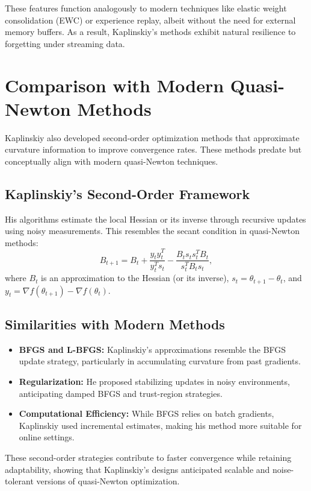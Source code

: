 \documentclass[12pt]{article}
\begin{document}
These features function analogously to modern techniques like elastic weight consolidation (EWC) or experience replay, albeit without the need for external memory buffers. As a result, Kaplinskiy's methods exhibit natural resilience to forgetting under streaming data.

\section{Comparison with Modern Quasi-Newton Methods}
Kaplinskiy also developed second-order optimization methods that approximate curvature information to improve convergence rates. These methods predate but conceptually align with modern quasi-Newton techniques.

\subsection*{Kaplinskiy's Second-Order Framework}
His algorithms estimate the local Hessian or its inverse through recursive updates using noisy measurements. This resembles the secant condition in quasi-Newton methods:
\begin{equation}
B_{t+1} = B_t + \frac{y_t y_t^T}{y_t^T s_t} - \frac{B_t s_t s_t^T B_t}{s_t^T B_t s_t},
\end{equation}
where $B_t$ is an approximation to the Hessian (or its inverse), $s_t = \theta_{t+1} - \theta_t$, and $y_t = \nabla f(\theta_{t+1}) - \nabla f(\theta_t)$.

\subsection*{Similarities with Modern Methods}
\begin{itemize}
\item \textbf{BFGS and L-BFGS:} Kaplinskiy's approximations resemble the BFGS update strategy, particularly in accumulating curvature from past gradients.
\item \textbf{Regularization:} He proposed stabilizing updates in noisy environments, anticipating damped BFGS and trust-region strategies.
\item \textbf{Computational Efficiency:} While BFGS relies on batch gradients, Kaplinskiy used incremental estimates, making his method more suitable for online settings.
\end{itemize}

These second-order strategies contribute to faster convergence while retaining adaptability, showing that Kaplinskiy's designs anticipated scalable and noise-tolerant versions of quasi-Newton optimization.
\end{document}
